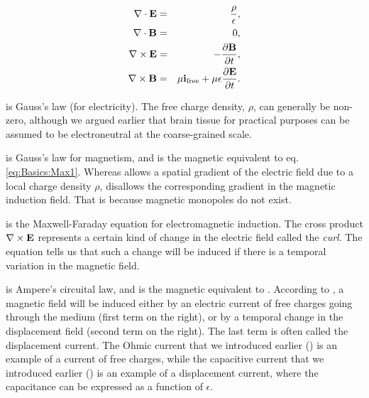 \begin{eqnarray}
{\bf \nabla}\cdot {\bf E} & = & \frac{\rho}{\epsilon}, \label{eq:Basics:Max1} \\
{\bf \nabla} \cdot {\bf B} & = & 0,  \label{eq:Basics:Max2} \\
{\bf \nabla} \times {\bf E} & = & - \frac{\partial {\bf B}}{\partial t}, \label{eq:Basics:Max3} \\
{\bf \nabla} \times {\bf B} & = & \mu {\bf i}_\text{free} + \mu\epsilon\frac{\partial {\bf E}}{\partial t}.  \label{eq:Basics:Max4}
\end{eqnarray}

 is Gauss's law (for electricity). The free charge density, $\rho$, can generally be non-zero, although we argued earlier that brain tissue for practical purposes can be assumed to be electroneutral at the coarse-grained scale.

 is Gauss's law for magnetism, and is the magnetic equivalent to eq. \ref{eq:Basics:Max1}. Whereas  allows a spatial gradient of the electric field due to a local charge density $\rho$,  disallows the corresponding gradient in the magnetic induction field. That is because magnetic monopoles do not exist. 

 is the Maxwell-Faraday equation for electromagnetic induction. The cross product ${\bf \nabla} \times {\bf E}$ represents a certain kind of change in the electric field called the \textit{curl}. The equation tells us that such a change will be induced if there is a temporal variation in the magnetic field.

 is Ampere's circuital law, and is the magnetic equivalent to . According to , a magnetic field will be induced either by an electric current of free charges going through the medium (first term on the right), or by a temporal change in the displacement field (second term on the right). The last term is often called the displacement current. The Ohmic current that we introduced earlier () is an example of a current of free charges, while the capacitive current that we introduced earlier () is an example of a displacement current, where the capacitance can be expressed as a function of $\epsilon$.

